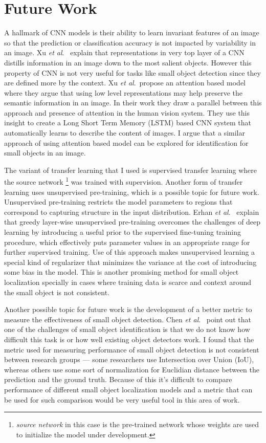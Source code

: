 \documentclass [11pt,letterpaper ,twoside ,openany ]{report}
\begin{document}
    \section{Future Work}
    A hallmark of CNN models is their ability to learn invariant features of an image so that the prediction or classification accuracy is not impacted by variability in an image. Xu \textit {et al}.\ \cite{xu2015show} explain that representations in very top layer of a CNN distills information in an image down to the most salient objects. However this property of CNN is not very useful for tasks like small object detection since they are defined more by the context. Xu \textit {et al}.\ propose an attention based model \cite{xu2015show} where they argue that using low level representations may help preserve the semantic information in an image. In their work they draw a parallel between this approach and presence of attention in the human vision system. They use this insight to create a Long Short Term Memory (LSTM) based CNN system that automatically learns to describe the content of images. I argue that a similar approach of using attention based model can be explored for identification for small objects in an image.

    The variant of transfer learning that I used is supervised transfer learning where the source network \footnote{\textit{source network} in this case is the pre-trained network whose weights are used to initialize the model under development.} was trained with supervision. Another form of transfer learning uses unsupervised pre-training, which is a possible topic for future work. Unsupervised pre-training restricts the model parameters to regions that correspond to capturing structure in the input distribution. Erhan \textit {et al}.\ \cite{erhan2010does} explain that greedy layer-wise unsupervised pre-training overcomes the challenges of deep learning by introducing a useful prior to the supervised fine-tuning training procedure, which effectively puts parameter values in an appropriate range for further supervised training. Use of this approach makes unsupervised learning a special kind of regularizer that minimizes the variance at the cost of introducing some bias in the model. This is another promising method for small object localization specially in cases where training data is scarce and context around the small object is not consistent.

    Another possible topic for future work is the development of a better metric to measure the effectiveness of small object detection. Chen \textit {et al}.\ \cite{chen2016r} point out that one of the challenges of small object identification is that we do not know how difficult this task is or how well existing object detectors work. I found that the metric used for measuring performance of small object detection is not consistent between research groups --- some researchers use Intersection over Union (IoU), whereas others use some sort of normalization for Euclidian distance between the prediction and the ground truth. Because of this it's difficult to compare performance of different small object localization models and a metric that can be used for such comparison would be very useful tool in this area of work.

    \printbibliography
\end{document}

